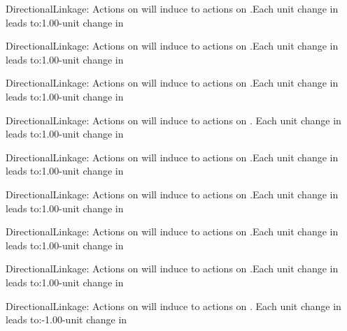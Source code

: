 \begin{constraints}
\item DirectionalLinkage: Actions on  will induce to actions on .Each unit change in  leads to:1.00-unit change in 
\item DirectionalLinkage: Actions on  will induce to actions on .Each unit change in  leads to:1.00-unit change in 
\item DirectionalLinkage: Actions on  will induce to actions on .Each unit change in  leads to:1.00-unit change in 
\item DirectionalLinkage: Actions on  will induce to actions on . Each unit change in  leads to:1.00-unit change in 
\item DirectionalLinkage: Actions on  will induce to actions on .Each unit change in  leads to:1.00-unit change in 
\item DirectionalLinkage: Actions on  will induce to actions on .Each unit change in  leads to:1.00-unit change in 
\item DirectionalLinkage: Actions on  will induce to actions on .Each unit change in  leads to:1.00-unit change in 
\item DirectionalLinkage: Actions on  will induce to actions on .Each unit change in  leads to:1.00-unit change in 
\item DirectionalLinkage: Actions on  will induce to actions on . Each unit change in  leads to:-1.00-unit change in 

\end{constraints}
